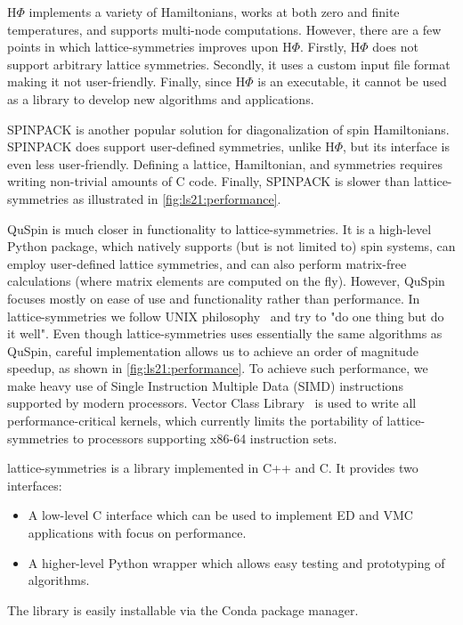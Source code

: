 $\text{H}\Phi$ implements a variety of Hamiltonians, works at both zero and finite temperatures, and supports multi-node computations. However, there are a few points in which lattice-symmetries improves upon $\text{H}\Phi$. Firstly, $\text{H}\Phi$ does not support arbitrary lattice symmetries. Secondly, it uses a custom input file format making it not user-friendly. Finally, since $\text{H}\Phi$ is an executable, it cannot be used as a library to develop new algorithms and applications.

SPINPACK is another popular solution for diagonalization of spin Hamiltonians. SPINPACK does support user-defined symmetries, unlike $\text{H}\Phi$, but its interface is even less user-friendly. Defining a lattice, Hamiltonian, and symmetries requires writing non-trivial amounts of C code. Finally, SPINPACK is slower than lattice-symmetries as illustrated in \autoref{fig:ls21:performance}.

QuSpin is much closer in functionality to lattice-symmetries. It is a high-level Python package, which natively supports (but is not limited to) spin systems, can employ user-defined lattice symmetries, and can also perform matrix-free calculations (where matrix elements are computed on the fly). However, QuSpin focuses mostly on ease of use and functionality rather than performance. In lattice-symmetries we follow UNIX philosophy~\cite{salus1994} and try to "do one thing but do it well". Even though lattice-symmetries uses essentially the same algorithms as QuSpin, careful implementation allows us to achieve an order of magnitude speedup, as shown in \autoref{fig:ls21:performance}. To achieve such performance, we make heavy use of Single Instruction Multiple Data (SIMD) instructions supported by modern processors. Vector Class Library~\cite{vectorclass} is used to write all performance-critical kernels, which currently limits the portability of lattice-symmetries to processors supporting x86-64 instruction sets.

lattice-symmetries is a library implemented in C++ and C. It provides two interfaces:
\begin{itemize}[topsep=0pt,noitemsep]
  \item A low-level C interface which can be used to implement ED and VMC applications with focus on performance.
  \item A higher-level Python wrapper which allows easy testing and prototyping of algorithms.
\end{itemize}

The library is easily installable via the Conda package manager.

